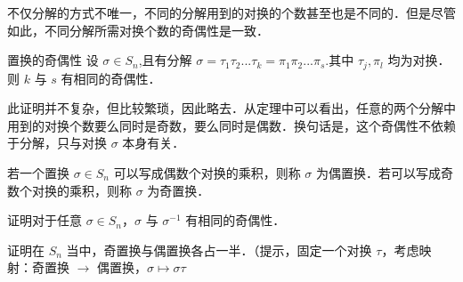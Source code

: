 不仅分解的方式不唯一，不同的分解用到的对换的个数甚至也是不同的．但是尽管如此，不同分解所需对换个数的奇偶性是一致．

\begin{theorem}{置换的奇偶性}
设 $\sigma\in S_n$,且有分解 $\sigma=\tau_1\tau_2...\tau_k=\pi_1\pi_2...\pi_s$.其中 $\tau_j, \pi_l$ 均为对换．则 $k$ 与 $s$ 有相同的奇偶性．
\end{theorem}
此证明并不复杂，但比较繁琐，因此略去．从定理中可以看出，任意的两个分解中用到的对换个数要么同时是奇数，要么同时是偶数．换句话是，这个奇偶性不依赖于分解，只与对换 $\sigma$ 本身有关．

\begin{definition}{}
若一个置换 $\sigma\in S_n$ 可以写成偶数个对换的乘积，则称 $\sigma$ 为偶置换．若可以写成奇数个对换的乘积，则称 $\sigma$ 为奇置换．
\end{definition}

\begin{exercise}{}
证明对于任意 $\sigma\in S_n$，$\sigma$ 与 $\sigma^{-1}$ 有相同的奇偶性．
\end{exercise}

\begin{exercise}{}
证明在 $S_n$ 当中，奇置换与偶置换各占一半．（提示，固定一个对换 $\tau$，考虑映射：奇置换 $\to$ 偶置换，$\sigma\mapsto\sigma\tau$
\end{exercise}

